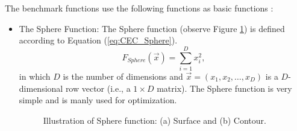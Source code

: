 The benchmark functions use the following functions as basic functions \cite{CEC:Tang2010}:
\begin{itemize}
  \item The Sphere Function: The Sphere function (observe Figure \ref{fig:CEC_Sphere}) is defined according to Equation (\ref{eq:CEC_Sphere}).
    \begin{equation}\label{eq:CEC_Sphere}
    F_{Sphere}(\vec{x}) = \sum_{i=1}^{D}x_i^2,
    \end{equation}
    in which $D$ is the number of dimensions and $\vec{x} = (x_1, x_2, \ldots, x_D)$ is a $D$-dimensional row vector (i.e., a $1 \times D$ matrix). The Sphere function is very simple and is manly used for optimization.
    \begin{figure}[!h]
    \centering
    \hspace{1mm}
    \caption{Illustration of Sphere function: (a) Surface and (b) Contour.}
    \label{fig:CEC_Sphere}
    \end{figure}


\end{itemize}

